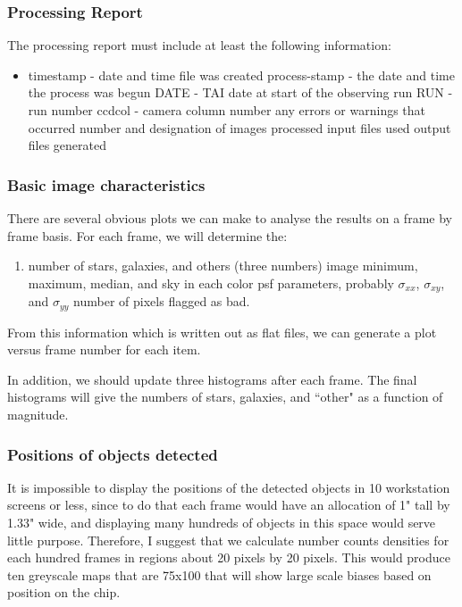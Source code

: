\subsubsection{Processing Report}

The processing report must include at least the following information:
\begin{itemize}
\item timestamp - date and time file was created
\sitem process-stamp - the date and time the process was begun
\sitem DATE - TAI date at start of the observing run
\sitem RUN - run number
\sitem ccdcol - camera column number
\sitem any errors or warnings that occurred
\sitem number and designation of images processed
\sitem input files used
\sitem output files generated
\end{itemize}

\subsubsection{Basic image characteristics}

	There are several obvious plots we can make to analyse the
results on a frame by frame basis.  For each frame, we will determine
the:
\begin{enumerate}
\item number of stars, galaxies, and others (three numbers)
\sitem image minimum, maximum, median, and sky in each color
\sitem psf parameters, probably $\sigma_{xx}$, $\sigma_{xy}$, and $\sigma_{yy}$
\sitem number of pixels flagged as bad.
\end{enumerate}
From this information which is written out as flat files, we can generate
a plot versus frame number for each item.

In addition, we should update three histograms after each frame.  The final
histograms will give the numbers of stars, galaxies, and ``other" as a
function of magnitude.

\subsubsection{Positions of objects detected}

	It is impossible to display the positions of the detected objects
in 10 workstation screens or less, since to do that each frame would have
an allocation of 1" tall by 1.33" wide, and displaying many hundreds of 
objects in this space would serve little purpose.
Therefore, I suggest that we calculate number counts densities for each
hundred frames in regions about 20 pixels by 20 pixels.  This would produce
ten greyscale maps that are 75x100 that will show large scale biases based
on position on the chip.

